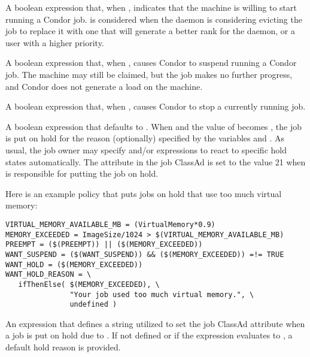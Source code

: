 \begin{description}

\label{param:Start}
\item[\Macro{START}]
  A boolean expression
  that, when , indicates that the machine is willing
  to start running a Condor job.
   is considered when the  daemon
  is considering evicting the job to replace it with one that will
  generate a better rank for the  daemon,
  or a user with a higher priority.

\label{param:Suspend}
\item[\Macro{SUSPEND}]
  A boolean expression that, when ,
  causes Condor to suspend running a Condor job.
  The machine may still be claimed, but the job makes no further
  progress, and Condor does not generate a load on the machine.

\label{param:Preempt}
\item[\Macro{PREEMPT}]
  A boolean expression that, when ,
  causes Condor to stop a currently running job.

\label{param:WantHold}
\item[\Macro{WANT\_HOLD}]
  A boolean expression that defaults to .
  When  and the value of  becomes ,
  the job is put on hold for the reason
  (optionally) specified by the variables  and
  .
  As usual, the job owner may specify
   and/or 
  expressions to react to specific hold states automatically.
  The attribute  in the job ClassAd is set to 
  the value 21 when
   is responsible for putting the job on hold.

  Here is an example policy that puts jobs on hold
  that use too much virtual memory:

\footnotesize
\begin{verbatim}
VIRTUAL_MEMORY_AVAILABLE_MB = (VirtualMemory*0.9)
MEMORY_EXCEEDED = ImageSize/1024 > $(VIRTUAL_MEMORY_AVAILABLE_MB)
PREEMPT = ($(PREEMPT)) || ($(MEMORY_EXCEEDED))
WANT_SUSPEND = ($(WANT_SUSPEND)) && ($(MEMORY_EXCEEDED)) =!= TRUE
WANT_HOLD = ($(MEMORY_EXCEEDED))
WANT_HOLD_REASON = \
   ifThenElse( $(MEMORY_EXCEEDED), \
               "Your job used too much virtual memory.", \
               undefined )
\end{verbatim}
\normalsize

\label{param:WantHoldReason}
\item[\Macro{WANT\_HOLD\_REASON}]
  An expression that defines a string utilized to set the job ClassAd
  attribute  when a job is put on hold due to
  \MacroNI{WANT\_HOLD}.
  If not defined or if the expression evaluates to \Expr{Undefined},
  a default hold reason is provided.


\end{description}
